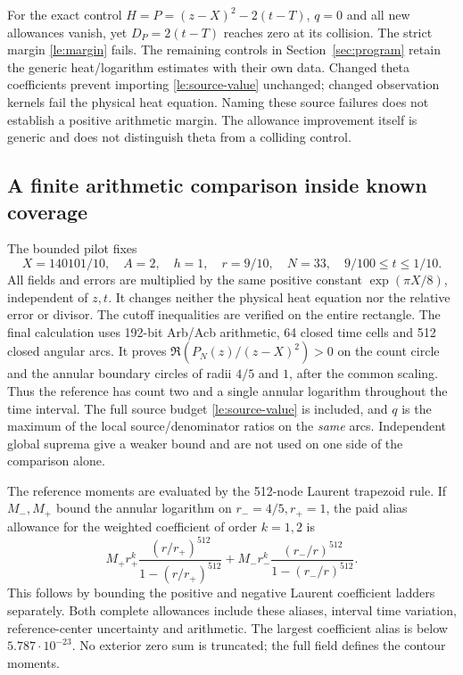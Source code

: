 For the exact control $H=P=(z-X)^2-2(t-T)$, $q=0$ and all new allowances
vanish, yet $D_P=2(t-T)$ reaches zero at its collision. The strict margin
\eqref{le:margin} fails. The remaining controls in Section~\ref{sec:program}
retain the generic heat/logarithm estimates with their own data. Changed
theta coefficients prevent importing \eqref{le:source-value} unchanged;
changed observation kernels fail the physical heat equation. Naming these
source failures does not establish a positive arithmetic margin. The
allowance improvement itself is generic and does not distinguish theta
from a colliding control.

\subsection{A finite arithmetic comparison inside known coverage}
\label{le:pilot}

The bounded pilot fixes
\begin{equation}
 X=140101/10,\quad A=2,\quad h=1,\quad r=9/10,\quad
 N=33,\quad 9/100\le t\le1/10.
 \label{le:pilot-cell}
\end{equation}
All fields and errors are multiplied by the same positive constant
$\exp(\pi X/8)$, independent of $z,t$. It changes neither the physical
heat equation nor the relative error or divisor. The cutoff inequalities
are verified on the entire rectangle. The final calculation uses
192-bit Arb/Acb arithmetic, 64 closed time cells and 512 closed angular
arcs. It proves $\Re(P_N(z)/(z-X)^2)>0$ on the count circle and the
annular boundary circles of radii $4/5$ and $1$, after the common scaling.
Thus the reference has count two and a single annular logarithm throughout
the time interval. The full source budget \eqref{le:source-value} is
included, and $q$ is the maximum of the local source/denominator ratios
on the \emph{same} arcs. Independent global suprema give a weaker bound
and are not used on one side of the comparison alone.

The reference moments are evaluated by the 512-node Laurent trapezoid
rule. If $M_-,M_+$ bound the annular logarithm on $r_-=4/5,r_+=1$,
the paid alias allowance for the weighted coefficient of order $k=1,2$ is
\begin{equation}
 M_+ r_+^k\frac{(r/r_+)^{512}}{1-(r/r_+)^{512}}
 +M_- r_-^k\frac{(r_-/r)^{512}}{1-(r_-/r)^{512}}.
 \label{le:aliases}
\end{equation}
This follows by bounding the positive and negative Laurent coefficient
ladders separately. Both complete allowances include these aliases,
interval time variation, reference-center uncertainty and arithmetic.
The largest coefficient alias is below $5.787\cdot10^{-23}$.
No exterior zero sum is truncated; the full field defines the contour
moments.

